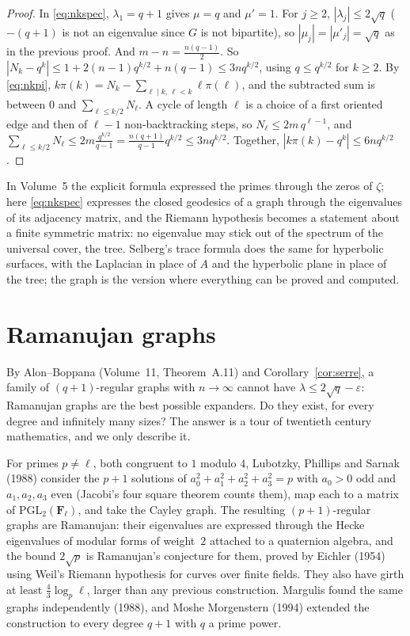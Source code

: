 \begin{proof}
In \eqref{eq:nkspec}, $\lambda_1=q+1$ gives $\mu=q$ and $\mu'=1$. For $j\ge2$, $|\lambda_j|\le2\sqrt q$ ($-(q+1)$ is not an eigenvalue since $G$ is not bipartite), so $|\mu_j|=|\mu'_j|=\sqrt q$ as in the previous proof. And
$m-n=\frac{n(q-1)}2$. So $|N_k-q^k|\le1+2(n-1)q^{k/2}+n(q-1)\le3nq^{k/2}$, using $q\le q^{k/2}$ for $k\ge2$. By \eqref{eq:nkpi}, $k\pi(k)=N_k-\sum_{\ell\mid k,\,\ell<k}\ell\pi(\ell)$, and the subtracted sum is between $0$ and
$\sum_{\ell\le k/2}N_\ell$. A cycle of length $\ell$ is a choice of a first oriented edge and then of $\ell-1$ non-backtracking steps, so $N_\ell\le2m\,q^{\ell-1}$, and
$\sum_{\ell\le k/2}N_\ell\le2m\frac{q^{k/2}}{q-1}=\frac{n(q+1)}{q-1}q^{k/2}\le3nq^{k/2}$. Together, $|k\pi(k)-q^k|\le6nq^{k/2}$.
\end{proof}

\begin{beauty}
In Volume~5 the explicit formula expressed the primes through the zeros of $\zeta$; here \eqref{eq:nkspec} expresses the closed geodesics of a graph through the eigenvalues of its adjacency matrix, and the Riemann hypothesis
becomes a statement about a finite symmetric matrix: no eigenvalue may stick out of the spectrum of the universal cover, the tree. Selberg's trace formula does the same for hyperbolic surfaces, with the Laplacian
in place of $A$ and the hyperbolic plane in place of the tree; the graph is the version where everything can be proved and computed.
\end{beauty}

\section{Ramanujan graphs}

By Alon--Boppana (Volume~11, Theorem~A.11) and Corollary~\ref{cor:serre}, a family of $(q+1)$-regular graphs with $n\to\infty$ cannot have $\lambda\le2\sqrt q-\varepsilon$: Ramanujan graphs are the best possible expanders. Do they exist,
for every degree and infinitely many sizes? The answer is a tour of twentieth century mathematics, and we only describe it.

\begin{remark}
For primes $p\ne\ell$, both congruent to $1$ modulo $4$, Lubotzky, Phillips and Sarnak (1988) consider the $p+1$ solutions of $a_0^2+a_1^2+a_2^2+a_3^2=p$ with $a_0>0$ odd and $a_1,a_2,a_3$ even (Jacobi's four square theorem counts them),
map each to a matrix of $\mathrm{PGL}_2(\mathbf F_\ell)$, and take the Cayley graph. The resulting $(p+1)$-regular graphs are Ramanujan: their eigenvalues are expressed through the Hecke eigenvalues of modular forms of
weight~$2$ attached to a quaternion algebra, and the bound $2\sqrt p$ is Ramanujan's conjecture for them, proved by Eichler (1954) using Weil's Riemann hypothesis for curves over finite fields. They also have girth at
least $\frac43\log_p\ell$, larger than any previous construction. Margulis found the same graphs independently (1988), and Moshe Morgenstern (1994) extended the construction to every degree $q+1$ with $q$ a prime power.
\end{remark}

